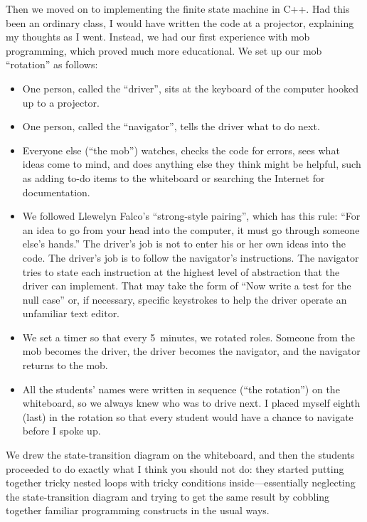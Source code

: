 \documentclass{article}
\begin{document}
Then we moved on to implementing the finite state machine in C++. Had this
been an ordinary class, I would have written the code at a projector,
explaining my thoughts as I went. Instead, we had our first experience with
mob programming, which proved much more educational. We set up our mob
``rotation'' as follows:

\begin{itemize}
\item One person, called the ``driver'', sits at the keyboard of the computer
hooked up to a projector.

\item One person, called the ``navigator'', tells the driver what to do next.

\item Everyone else (``the mob'') watches, checks the code for errors, sees
what ideas come to mind, and does anything else they think might be helpful,
such as adding to-do items to the whiteboard or searching the Internet for
documentation.

\item We followed Llewelyn Falco's ``strong-style
pairing''\cite{falco2014strong}, which has this rule: ``For an idea to go from
your head into the computer, it must go through someone else's hands.'' The
driver's job is not to enter his or her own ideas into the code. The driver's
job is to follow the navigator's instructions. The navigator tries to state
each instruction at the highest level of abstraction that the driver can
implement. That may take the form of ``Now write a test for the null case''
or, if necessary, specific keystrokes to help the driver operate an unfamiliar
text editor.


\item We set a timer so that every 5~minutes, we rotated roles. Someone from
the mob becomes the driver, the driver becomes the navigator, and the
navigator returns to the mob.

\item All the students' names were written in sequence (``the rotation'')
on the whiteboard, so we always knew who was to drive next. I placed myself
eighth (last) in the rotation so that every student would have a chance to
navigate before I spoke up.
\end{itemize}

We drew the state-transition diagram on the whiteboard, and then the students
proceeded to do exactly what I think you should not do: they started putting
together tricky nested loops with tricky conditions inside---essentially
neglecting the state-transition diagram and trying to get the same result by
cobbling together familiar programming constructs in the usual ways.
\end{document}
